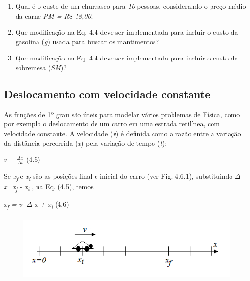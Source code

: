 \begin{enumerate}
	\item Qual é o custo de um churrasco para \textit{10} pessoas, considerando o preço médio da carne \textit{PM = R$\$$  18,00}.

	\item Que modificação na Eq. 4.4 deve ser implementada para incluir o custo da  gasolina (\textit{g}) usada para buscar os mantimentos?

	\item Que modificação na Eq. 4.4 deve ser implementada para incluir o custo da  sobremesa (\textit{SM})?
\end{enumerate}

\subsection{Deslocamento com velocidade constante}

As funções de 1º grau são úteis para modelar vários problemas de Física, como por exemplo o deslocamento de um carro em uma estrada retilínea, com velocidade constante. A velocidade (\textit{v}) é definida como a razão entre a variação da distância percorrida (\textit{x}) pela variação de tempo (\textit{t}):

\begin{FlushRight}
 \( v=\frac{ \Delta x}{ \Delta t} \) \tab (4.5)
\end{FlushRight}

Se  \textit{x\textsubscript{f}  }e\textit{ x\textsubscript{i}} são as posições final e inicial do carro (ver Fig. 4.6.1), substituindo \textit{$ \Delta $ x=x\textsubscript{f} - x\textsubscript{i}} , na Eq. (4.5), temos

\begin{FlushRight}
\textit{x\textsubscript{f} = v$ \cdot $ $ \Delta $ x + x\textsubscript{i}} \tab (4.6)
\end{FlushRight}

\begin{figure}[H]
	\begin{Center}
		\includegraphics[width=4.8in,height=1.33in]{capitulos/funcao_do_primeiro_grau/media/image23.png}
	\end{Center}
\end{figure}


